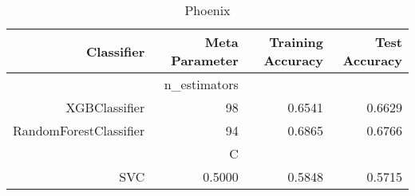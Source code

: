 
\begin{table}[H]
    \caption{Phoenix}
    \centering
    \begin{tabular}{|r|r|r|r|}
        \hline
        Classifier &Meta Parameter &Training Accuracy
        &Test Accuracy\\
        \hline
        &n\_estimators &\multicolumn{2}{|r|}{}\\
        \hline
        XGBClassifier &98 &0.6541 &0.6629\\
        \hline
        RandomForestClassifier &94 &0.6865 &0.6766\\
        \hline
        &C &\multicolumn{2}{|r|}{}\\
        \hline
        SVC &0.5000 &0.5848 &0.5715\\
        \hline
    \end{tabular}
\end{table}
